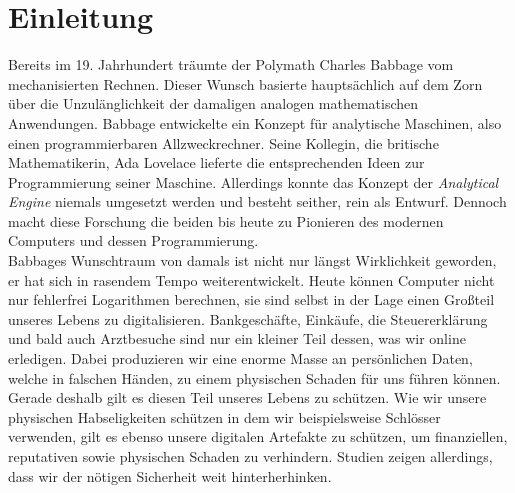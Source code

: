 \documentclass[
    12pt, %
    DIV10,
    ngerman, %
    a4paper, %
    oneside, %
    titlepage, %
    parskip=half, %
    headings=normal, %
    listof=totoc, %
    bibliography=totoc, %
    index=totoc, %
    captions=tableheading, %
    final %
]{scrreprt}
\begin{document}
\chapter{Einleitung}
Bereits im 19. Jahrhundert träumte der Polymath Charles Babbage vom mechanisierten Rechnen. Dieser Wunsch basierte hauptsächlich auf dem Zorn über die Unzulänglichkeit der damaligen analogen mathematischen Anwendungen. Babbage entwickelte ein Konzept für analytische Maschinen, also einen programmierbaren Allzweckrechner. Seine Kollegin, die britische Mathematikerin, Ada Lovelace lieferte die entsprechenden Ideen zur Programmierung seiner Maschine. Allerdings konnte das Konzept der \emph{Analytical Engine} niemals umgesetzt werden und besteht seither, rein als Entwurf. Dennoch macht diese Forschung die beiden bis heute zu Pionieren des modernen Computers und dessen Programmierung.\\
Babbages Wunschtraum von damals ist nicht nur längst Wirklichkeit geworden, er hat sich in rasendem Tempo weiterentwickelt. Heute können Computer nicht nur fehlerfrei Logarithmen berechnen, sie sind selbst in der Lage einen Großteil unseres Lebens zu digitalisieren. Bankgeschäfte, Einkäufe, die Steuererklärung und bald auch Arztbesuche sind nur ein kleiner Teil dessen, was wir online erledigen. Dabei produzieren wir eine enorme Masse an persönlichen Daten, welche in falschen Händen, zu einem physischen Schaden für uns führen können. Gerade deshalb gilt es diesen Teil unseres Lebens zu schützen. Wie wir unsere physischen Habseligkeiten schützen in dem wir beispielsweise Schlösser verwenden, gilt es ebenso unsere digitalen Artefakte zu schützen, um finanziellen, reputativen sowie physischen Schaden zu verhindern. Studien zeigen allerdings, dass wir der nötigen Sicherheit weit hinterherhinken. 
\end{document}
